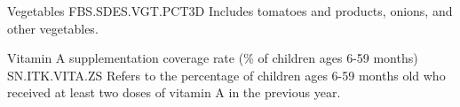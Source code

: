 \begin{MetadataCollection}
\begin{metadata}{ Vegetables }{ FBS.SDES.VGT.PCT3D }
Includes tomatoes and products, onions, and other vegetables. 
\end{metadata}

\begin{metadata}{ Vitamin A supplementation coverage rate (\% of children ages 6-59 months) }{ SN.ITK.VITA.ZS }
Refers to the percentage of children ages 6-59 months old who received at least two doses of vitamin A in the previous year. 
\end{metadata}

\onecolumn

{}

\clearpage

\end{MetadataCollection}
